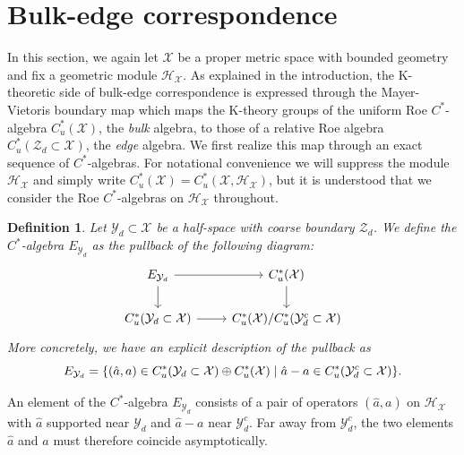 \documentclass[12pt]{amsart}
\newtheorem{definition}[theorem]{Definition}
\newcommand{\Hh}{{\mathcal H}}
\newcommand{\Xx}{{\mathcal X}}
\newcommand{\Yy}{{\mathcal Y}}
\newcommand{\Zz}{{\mathcal Z}}
\begin{document}
\section{Bulk-edge correspondence}\label{sec:bulk_edge_correspondence}

In this section, we again let $\Xx$ be a proper metric space with bounded geometry and fix a geometric module $\Hh_\Xx$. As explained in the introduction, the K-theoretic side of bulk-edge correspondence is expressed through the Mayer-Vietoris boundary map which maps the K-theory groups of the uniform Roe $C^*$-algebra $C^*_u(\Xx)$, the \textit{bulk} algebra, to those of a relative Roe algebra $C^*_u(\Zz_d \subset \Xx)$, the \textit{edge} algebra. We first realize this map through an exact sequence of $C^*$-algebras. For notational convenience we will suppress the module $\Hh_\Xx$ and simply write $C^*_u(\Xx)=C^*_u(\Xx, \Hh_\Xx)$, but it is understood that we consider the Roe $C^*$-algebras on $\Hh_\Xx$ throughout.

\begin{definition}
\label{def:pullback}
Let $\Yy_d\subset \Xx$ be a half-space with coarse boundary $\Zz_d$.
We define the $C^*$-algebra $E_{\Yy_d}$ as the pullback of the following diagram:
\begin{equation*}
	\begin{tikzcd}
		 E_{\Yy_d} \arrow[r] \arrow[d] & C^*_u(\Xx) \arrow[d] \\
		 C^*_u(\Yy_d \subset \Xx)  \arrow[r] & C^*_u(\Xx)/C^*_u(\Yy_d^c \subset \Xx)
	\end{tikzcd}
\end{equation*}
More concretely, we have an explicit description of the pullback as
$$E_{\Yy_d} = \{(\hat{a},a) \in C^*_u(\Yy_d \subset \Xx) \oplus C^*_u(\Xx) \hspace{0.1cm} \vert \hspace{0.1cm} \hat{a}-a \in C^*_u(\Yy_d^c \subset \Xx)\}.$$
\end{definition}
An element of the $C^*$-algebra $E_{\Yy_d}$ consists of a pair of operators $(\hat{a},a)$ on $\Hh_\Xx$ with $\hat{a}$ supported near $\Yy_d$ and $\hat{a}-a$ near $\Yy_d^c$. Far away from $\Yy_d^c$, the two elements $\hat{a}$ and $a$ must therefore coincide asymptotically. 
\end{document}
